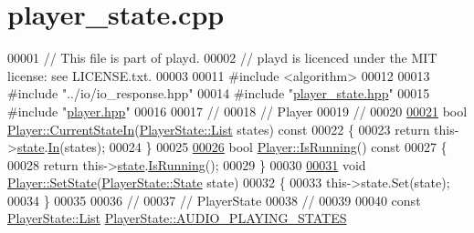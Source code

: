 \hypertarget{player__state_8cpp_source}{\section{player\+\_\+state.\+cpp}
\label{player__state_8cpp_source}
}

\begin{DoxyCode}
00001 \textcolor{comment}{// This file is part of playd.}
00002 \textcolor{comment}{// playd is licenced under the MIT license: see LICENSE.txt.}
00003 
00011 \textcolor{preprocessor}{#include <algorithm>}
00012 
00013 \textcolor{preprocessor}{#include "../io/io\_response.hpp"}
00014 \textcolor{preprocessor}{#include "\hyperlink{player__state_8hpp}{player\_state.hpp}"}
00015 \textcolor{preprocessor}{#include "\hyperlink{player_8hpp}{player.hpp}"}
00016 
00017 \textcolor{comment}{//}
00018 \textcolor{comment}{// Player}
00019 \textcolor{comment}{//}
00020 
\hypertarget{player__state_8cpp_source_l00021}{}\hyperlink{classPlayer_aa56e60cd7b83a4aa7ebda1e6ec054f4d}{00021} \textcolor{keywordtype}{bool} \hyperlink{classPlayer_aa56e60cd7b83a4aa7ebda1e6ec054f4d}{Player::CurrentStateIn}(\hyperlink{classPlayerState_a0f4e455f0579f97740855ccc6177c9f1}{PlayerState::List} states)\textcolor{keyword}{ const}
00022 \textcolor{keyword}{}\{
00023     \textcolor{keywordflow}{return} this->\hyperlink{classPlayer_afb60fdad921bce05783ef2709e849c27}{state}.\hyperlink{classPlayerState_aa2c0e603dd57dcc37759d716596ffa33}{In}(states);
00024 \}
00025 
\hypertarget{player__state_8cpp_source_l00026}{}\hyperlink{classPlayer_a0688e00b9fa4699dbe15c370b2703a68}{00026} \textcolor{keywordtype}{bool} \hyperlink{classPlayer_a0688e00b9fa4699dbe15c370b2703a68}{Player::IsRunning}()\textcolor{keyword}{ const}
00027 \textcolor{keyword}{}\{
00028     \textcolor{keywordflow}{return} this->\hyperlink{classPlayer_afb60fdad921bce05783ef2709e849c27}{state}.\hyperlink{classPlayerState_aeb19817b9da2f6765b990983f87e1527}{IsRunning}();
00029 \}
00030 
\hypertarget{player__state_8cpp_source_l00031}{}\hyperlink{classPlayer_a92807b30e89ece50e94dac493ee56b51}{00031} \textcolor{keywordtype}{void} \hyperlink{classPlayer_a92807b30e89ece50e94dac493ee56b51}{Player::SetState}(\hyperlink{classPlayerState_ab013f68ff23d69d677faae624b5dff07}{PlayerState::State} state)
00032 \{
00033     this->state.Set(state);
00034 \}
00035 
00036 \textcolor{comment}{//}
00037 \textcolor{comment}{// PlayerState}
00038 \textcolor{comment}{//}
00039 
00040 \textcolor{keyword}{const} \hyperlink{classPlayerState_a0f4e455f0579f97740855ccc6177c9f1}{PlayerState::List} \hyperlink{classPlayerState_aa5e7203a1fa44e8bceffe65b6ad2c554}{PlayerState::AUDIO\_PLAYING\_STATES}

\end{DoxyCode}
